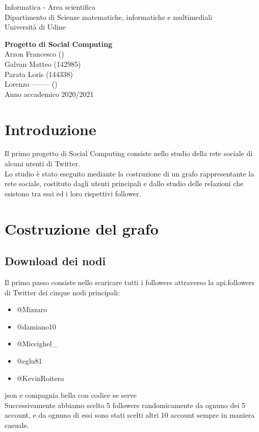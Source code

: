\documentclass[a4paper,11pt]{report}
\begin{document}
\begin{titlepage}
  \clearpage\thispagestyle{empty}
  \centering
  \vspace{1cm}
  {\normalsize Informatica - Area scientifica \\  Dipartimento di Scienze matematiche, informatiche e multimediali\\  Università di Udine \par}
  \vspace{3cm}
  {\Huge \textbf{Progetto di Social Computing}}\\
  \vspace{4cm}
  {\Large Arzon Francesco ()\\ Galvan Matteo (142985)\\ Parata Loris (144338)\\ Lorenzo -------- ()}\\
  \vspace{12cm}
  {\normalsize Anno accademico 2020/2021}
  \pagebreak
\end{titlepage}

\tableofcontents{}
\pagebreak

\chapter{Introduzione}
Il primo progetto di Social Computing consiste nello studio della rete sociale di alcuni utenti di Twitter.\\
Lo studio è stato eseguito mediante la costruzione di un grafo rappresentante la rete sociale, costituto dagli utenti principali e dallo studio delle relazioni che esistono tra essi ed i loro rispettivi follower.

\pagebreak

\chapter{Costruzione del grafo}
\section{Download dei nodi}
Il primo passo consiste nello scaricare tutti i followers attraverso la api.followers di Twitter dei cinque nodi principali:

\begin{itemize}
\item @Mizzaro
\item @damiano10
\item @Miccighel\_
\item @eglu81
\item @KevinRoitero
 \end{itemize}
json e compagnia bella con codice se serve \\
\setlength{\parindent}{0pt} 
Successivamente abbiamo scelto 5 followers randomicamente da ognuno dei 5 account, e da ognuno di essi sono stati scelti altri 10 account sempre in maniera casuale.\\
\end{document}
